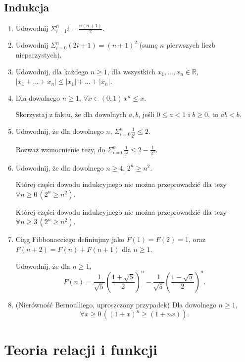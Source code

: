 \documentclass[12pt]{article}
\newcommand{\bR}{\mathbb{R}}
\begin{document}
\subsection{Indukcja}\label{ss:indukcja}
\begin{enumerate}
    \item Udowodnij $\Sigma_{i=1}^n i = \frac{n(n+1)}{2}$. 
    \item Udowodnij $\Sigma_{i=0}^n (2i+1) = (n+1)^2$
           (sumę $n$ pierwszych liczb nieparzystych).
    \item Udowodnij, dla każdego $n\geq 1$, dla wszystkich $x_1,\dots, x_n\in \bR$, $|x_1 + ... + x_n| \leq  |x_1| + ... + |x_n|$.
\item 
Dla dowolnego  $n\geq 1$, $\forall x \in (0,1)\, x^n \leq  x$.

Skorzystaj z faktu, że dla dowolnych $a,b$, jeśli $0\leq a < 1$ i $b\geq 0$, to $ab<b$.

\item 
Udowodnij, że dla dowolnego $n$, $\Sigma_{i=0}^n \frac{1}{2^i} \leq 2$.

Rozważ wzmocnienie  tezy, 
do $\Sigma_{i=0}^n \frac{1}{2^i} \leq 2-\frac{1}{2^{n}}$.

\item \label{ind:2nn2} Udowodnij, że dla dowolnego $n\geq 4$, $2^n\geq  n^2$.

Której części dowodu indukcyjnego nie można przeprowadzić 
dla tezy $\forall n\geq 0\, (2^n\geq n^2)$.

Której części dowodu indukcyjnego nie można przeprowadzić 
dla tezy $\forall n\geq 3\, (2^n\geq n^2)$.

\item Ciąg Fibbonacciego definiujmy jako 
$F(1)=F(2)=1$, oraz $F(n+2)=F(n)+F(n+1)$ dla $n\geq 1$.


Udowodnij, że dla $n\geq 1$, 
$$
F(n)=\frac{1}{\sqrt{5}}\left(\frac{1+\sqrt{5}}{2}\right)^n- 
    \frac{1}{\sqrt{5}}\left(\frac{1-\sqrt{5}}{2}\right)^n.
$$

\item 
(Nierówność  Bernoulliego,  uproszczony przypadek) Dla dowolnego $n\geq 1$, 
\[
\forall x \geq 0\, ((1+x)^n \geq (1+nx)).
\]

\end{enumerate}

\section{Teoria relacji i funkcji}
\end{document}
